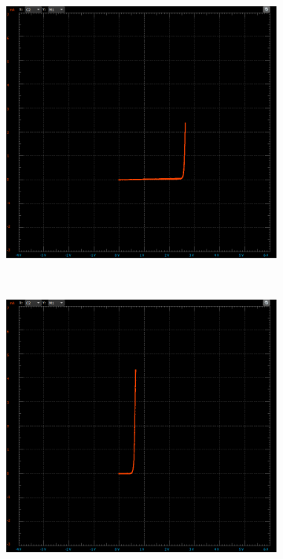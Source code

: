 \documentclass[12pt]{article}
\begin{document}
\begin{enumerate}
\begin{enumerate}
\begin{figure}[h!]
\begin{subfigure}[b]{0.31\textwidth}
            \end{subfigure}
            ~
            \begin{subfigure}[b]{0.31\textwidth}
                \includegraphics[width=\textwidth]{PAVB3.png}
            \end{subfigure}
            ~
            \begin{subfigure}[b]{0.31\textwidth}
                \includegraphics[width=\textwidth]{PAVB5.png}

\end{subfigure}
\end{figure}
\end{enumerate}
\end{enumerate}
\end{document}
